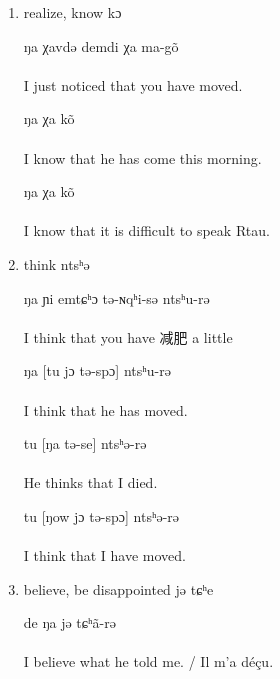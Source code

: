 \documentclass[oldfontcommands,oneside,a4paper,11pt]{article}
\newcommand{\ipa}[1]{{\phon #1}} %
\begin{document}
\begin{enumerate}
\item realize, know \ipa{kɔ}

\begin{exe}
\ex
\gll [ɲi jɔ tə-spej-sə] ŋa χavdə demdi χa ma-gõ \\
\\
\glt  I just noticed that you have moved.
\end{exe}

\begin{exe}
\ex
{} ŋa   χa kõ \\
\\
\glt  I know that he has come this morning.
\end{exe}

\begin{exe}
\ex
{} ŋa   χa kõ \\
\\
\glt  I know that it is difficult to speak Rtau.
\end{exe}

\item think \ipa{ntsʰə}

\begin{exe}
\ex
\gll ŋa ɲi emtɕʰɔ tə-ɴqʰi-sə ntsʰu-rə \\
\\
\glt   I think that you have 减肥 a little
\end{exe}

\begin{exe}
\ex
\gll ŋa [tu jɔ tə-spɔ] ntsʰu-rə \\
\\
\glt   I think that he has moved.
\end{exe}
 
\begin{exe}
\ex
\gll tu [ŋa  tə-se] ntsʰə-rə \\
\\
\glt  He thinks that I died.
\end{exe}


\begin{exe}
\ex
\gll tu [ŋow jɔ  tə-spɔ] ntsʰə-rə \\
\\
\glt   I think that I have moved.
\end{exe}

\item believe, be  disappointed \ipa{jə tɕʰe}
 
\begin{exe}
\ex
\gll [tu  ŋa-gi  jə-lə] de ŋa jə tɕʰã-rə \\
\\
\glt  I believe what he told me. / Il m'a déçu.
\end{exe}


\end{enumerate}
\end{document}
